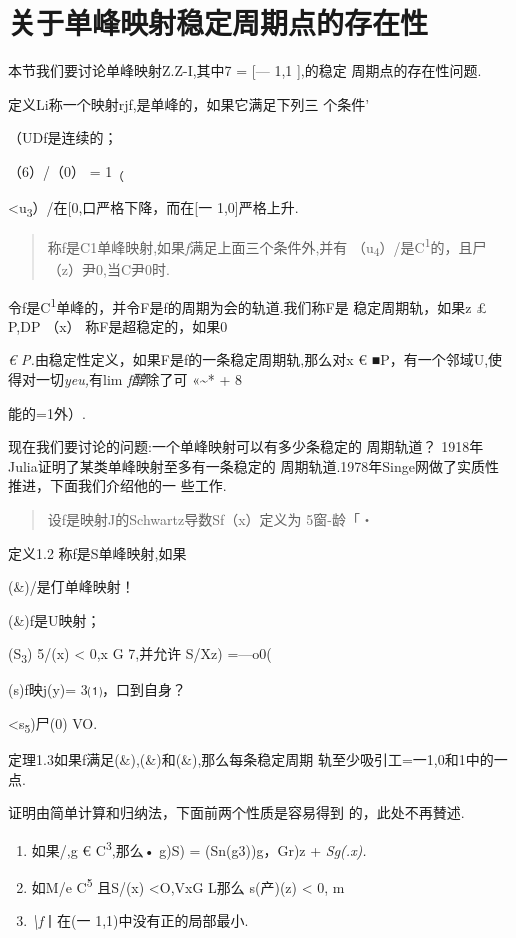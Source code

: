 \section{关于单峰映射稳定周期点的存在性}

本节我们要讨论单峰映射Z.Z-I,其中7 = {[}--- 1,1 {]},的稳定
周期点的存在性问题.

定义Li称一个映射rjf,是单峰的，如果它满足下列三 个条件'

（UDf是连续的；

（6）/（0） = 1\textsubscript{（}

\textless{}u\textsubscript{3}）/在{[}0,口严格下降，而在{[}一
1,0{]}严格上升.

\begin{quote}
称f是C1单峰映射,如果\emph{f}满足上面三个条件外,并有
（u\textsubscript{4}）/是C\textsuperscript{1}的，且尸（z）尹0,当C尹0时.
\end{quote}

令f是C\textsuperscript{1}单峰的，并令F是f的周期为会的轨道.我们称F是
稳定周期轨，如果z £ P,\textbar{}DP （x） \textbar{} 称F是超稳定的，如果0

\emph{€ P.}由稳定性定义，如果F是f的一条稳定周期轨,那么对x €
■P，有一个邻域U,使得对一切\emph{yeu,}有lim \emph{f醇}除了可
«\textasciitilde{}* + 8

能的=1外）.

现在我们要讨论的问题:一个单峰映射可以有多少条稳定的 周期轨道？
1918年Julia证明了某类单峰映射至多有一条稳定的
周期轨道.1978年Singe网做了实质性推进，下面我们介绍他的一 些工作.

\begin{quote}
设f是映射J的Schwartz导数Sf（x）定义为 5窗-龄「・
\end{quote}

定义1.2 称f是S单峰映射,如果

(\&)/是仃单峰映射！

(\&)f是U映射；

(S\textsubscript{3}) 5/(x) \textless{} 0,x G 7,并允许 S/Xz) =---o0(

(s)f映j(y)= 3⑴，口到自身？

\textless{}s\textsubscript{5})尸(0) VO.

定理1.3如果f满足(\&),(\&)和(\&),那么每条稳定周期
轨至少吸引工=一1,0和1中的一点.

证明由简单计算和归纳法，下面前两个性质是容易得到 的，此处不再賛述.

\begin{enumerate}
\def\labelenumi{\arabic{enumi}.}
\item
  如果/,g € C\textsuperscript{3},那么• g)S) = (Sn(g3))g，Gr)z +
  \emph{Sg(.x).}
\item
  如M/e C\textsuperscript{5} 且S/(x) \textless{}O,VxG L那么 s(产)(z)
  \textless{} 0, m
\item
  \emph{\textbackslash{}f}丨在(一 1,1)中没有正的局部最小.
\end{enumerate}

